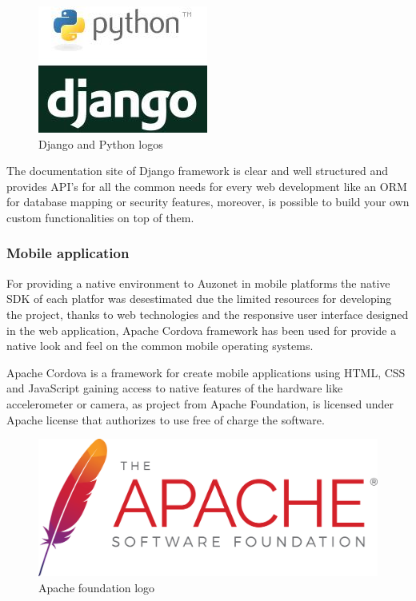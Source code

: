 \documentclass{DeustoFDP}
\begin{document}
\begin{figure}[h]
\centering
\includegraphics[width=0.5\linewidth]{fig/python-django}
\caption[Django and Python logos]{Django and Python logos}
\label{fig:python-django}
\end{figure}


The documentation site of Django framework is clear and well structured and provides API's for all the common needs for every web development like an ORM for database mapping or security features, moreover, is possible to build your own custom functionalities on top of them.

\subsubsection{Mobile application}
For providing a native environment to Auzonet in mobile platforms the native SDK of each platfor was desestimated due the limited resources for developing the project, thanks to web technologies and the responsive user interface designed in the web application, Apache Cordova framework has been used for provide a native look and feel on the common mobile operating systems.

Apache Cordova is a framework for create mobile applications using HTML, CSS and JavaScript gaining access to native features of the hardware like accelerometer or camera, as project from Apache Foundation, is licensed under Apache license that authorizes to use free of charge the software.

\begin{figure}[h]
\centering
\includegraphics[width=0.4\linewidth]{fig/apache}
\caption[Apache foundation logo]{Apache foundation logo}
\label{fig:apache}
\end{figure}
\end{document}
